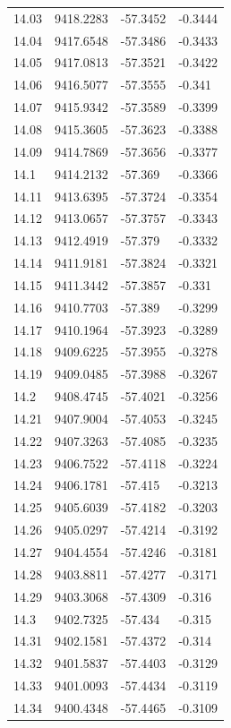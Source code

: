 \begin{table}[H]
\begin{tabular}{llll}
14.03 & 9418.2283 & -57.3452 & -0.3444 \\
14.04 & 9417.6548 & -57.3486 & -0.3433 \\
14.05 & 9417.0813 & -57.3521 & -0.3422 \\
14.06 & 9416.5077 & -57.3555 & -0.341 \\
14.07 & 9415.9342 & -57.3589 & -0.3399 \\
14.08 & 9415.3605 & -57.3623 & -0.3388 \\
14.09 & 9414.7869 & -57.3656 & -0.3377 \\
14.1 & 9414.2132 & -57.369 & -0.3366 \\
14.11 & 9413.6395 & -57.3724 & -0.3354 \\
14.12 & 9413.0657 & -57.3757 & -0.3343 \\
14.13 & 9412.4919 & -57.379 & -0.3332 \\
14.14 & 9411.9181 & -57.3824 & -0.3321 \\
14.15 & 9411.3442 & -57.3857 & -0.331 \\
14.16 & 9410.7703 & -57.389 & -0.3299 \\
14.17 & 9410.1964 & -57.3923 & -0.3289 \\
14.18 & 9409.6225 & -57.3955 & -0.3278 \\
14.19 & 9409.0485 & -57.3988 & -0.3267 \\
14.2 & 9408.4745 & -57.4021 & -0.3256 \\
14.21 & 9407.9004 & -57.4053 & -0.3245 \\
14.22 & 9407.3263 & -57.4085 & -0.3235 \\
14.23 & 9406.7522 & -57.4118 & -0.3224 \\
14.24 & 9406.1781 & -57.415 & -0.3213 \\
14.25 & 9405.6039 & -57.4182 & -0.3203 \\
14.26 & 9405.0297 & -57.4214 & -0.3192 \\
14.27 & 9404.4554 & -57.4246 & -0.3181 \\
14.28 & 9403.8811 & -57.4277 & -0.3171 \\
14.29 & 9403.3068 & -57.4309 & -0.316 \\
14.3 & 9402.7325 & -57.434 & -0.315 \\
14.31 & 9402.1581 & -57.4372 & -0.314 \\
14.32 & 9401.5837 & -57.4403 & -0.3129 \\
14.33 & 9401.0093 & -57.4434 & -0.3119 \\
14.34 & 9400.4348 & -57.4465 & -0.3109 \\

\end{tabular}
\end{table}
